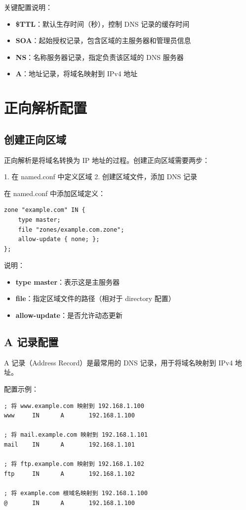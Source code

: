 \documentclass[12pt,UTF8]{ctexbook}
\begin{document}
关键配置说明：
\begin{itemize}
    \item \textbf{\$TTL}：默认生存时间（秒），控制 DNS 记录的缓存时间
    \item \textbf{SOA}：起始授权记录，包含区域的主服务器和管理员信息
    \item \textbf{NS}：名称服务器记录，指定负责该区域的 DNS 服务器
    \item \textbf{A}：地址记录，将域名映射到 IPv4 地址
\end{itemize}

\chapter{正向解析配置}
\label{chap:forward_dns}

\section{创建正向区域}
\label{sec:create_forward_zone}

正向解析是将域名转换为 IP 地址的过程。创建正向区域需要两步：

1. 在 named.conf 中定义区域
2. 创建区域文件，添加 DNS 记录

在 named.conf 中添加区域定义：
\begin{verbatim}
zone "example.com" IN {
    type master;
    file "zones/example.com.zone";
    allow-update { none; };
};
\end{verbatim}

说明：
\begin{itemize}
    \item \textbf{type master}：表示这是主服务器
    \item \textbf{file}：指定区域文件的路径（相对于 directory 配置）
    \item \textbf{allow-update}：是否允许动态更新
\end{itemize}

\section{A 记录配置}
\label{sec:a_record}

A 记录（Address Record）是最常用的 DNS 记录，用于将域名映射到 IPv4 地址。

配置示例：
\begin{verbatim}
; 将 www.example.com 映射到 192.168.1.100
www     IN      A       192.168.1.100

; 将 mail.example.com 映射到 192.168.1.101
mail    IN      A       192.168.1.101

; 将 ftp.example.com 映射到 192.168.1.102
ftp     IN      A       192.168.1.102

; 将 example.com 根域名映射到 192.168.1.100
@       IN      A       192.168.1.100
\end{verbatim}
\end{document}
